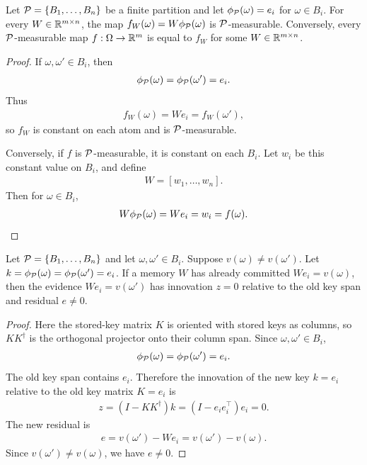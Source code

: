 \begin{theorem}
\label{thm:one-hot-measurable:formal}
Let $\mathcal{P}=\{B_1,\ldots,B_n\}$ be a finite partition and let $\phi_{\mathcal{P}}(\omega)=e_i$ for $\omega\in B_i$. For every $W\in\mathbb{R}^{m\times n}$, the map $f_W(\omega)=W\phi_{\mathcal{P}}(\omega)$ is $\mathcal{P}$-measurable. Conversely, every $\mathcal{P}$-measurable map $f:\Omega\to\mathbb{R}^m$ is equal to $f_W$ for some $W\in\mathbb{R}^{m\times n}$.
\end{theorem}
\begin{proof}
If $\omega,\omega'\in B_i$, then
\begin{align*}
\phi_{\mathcal{P}}(\omega)=\phi_{\mathcal{P}}(\omega')=e_i.
\end{align*}
Thus
\begin{align*}
f_W(\omega)=We_i=f_W(\omega'),
\end{align*}
so $f_W$ is constant on each atom and is $\mathcal{P}$-measurable.

Conversely, if $f$ is $\mathcal{P}$-measurable, it is constant on each $B_i$. Let $w_i$ be this constant value on $B_i$, and define
\begin{align*}
W=[w_1,\ldots,w_n].
\end{align*}
Then for $\omega\in B_i$,
\begin{align*}
W\phi_{\mathcal{P}}(\omega)=We_i=w_i=f(\omega).
\end{align*}
\end{proof}

\begin{theorem}
\label{thm:cpm-conflict-distinction:formal}
Let $\mathcal{P}=\{B_1,\ldots,B_n\}$ and let $\omega,\omega'\in B_i$. Suppose $v(\omega)\ne v(\omega')$. Let $k=\phi_{\mathcal{P}}(\omega)=\phi_{\mathcal{P}}(\omega')=e_i$. If a memory $W$ has already committed $We_i=v(\omega)$, then the evidence $We_i=v(\omega')$ has innovation $z=0$ relative to the old key span and residual $e\ne0$.
\end{theorem}
\begin{proof}
Here the stored-key matrix $K$ is oriented with stored keys as columns, so $KK^\dagger$ is the orthogonal projector onto their column span. Since $\omega,\omega'\in B_i$,
\begin{align*}
\phi_{\mathcal{P}}(\omega)=\phi_{\mathcal{P}}(\omega')=e_i.
\end{align*}
The old key span contains $e_i$. Therefore the innovation of the new key $k=e_i$ relative to the old key matrix $K=e_i$ is
\begin{align*}
z=(I-KK^\dagger)k=(I-e_ie_i^\top)e_i=0.
\end{align*}
The new residual is
\begin{align*}
e=v(\omega')-We_i=v(\omega')-v(\omega).
\end{align*}
Since $v(\omega')\ne v(\omega)$, we have $e\ne0$.
\end{proof}
